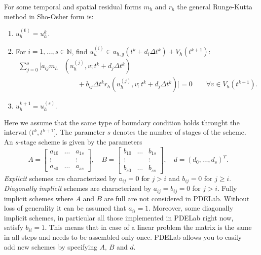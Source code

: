 \documentclass[a4paper,12pt]{article}
\begin{document}
For some temporal and spatial residual forms $m_h$ and $r_h$
the general Runge-Kutta method in Sho-Osher form is:
\begin{enumerate}
\item $u_h^{(0)} = u_h^{k}$.
\item For $i=1,\ldots,s\in\mathbb{N}$, find $u_h^{(i)}\in u_{h,g}(t^k+d_i \Delta t^k) 
+ V_h(t^{k+1})$:
\begin{equation*}
\begin{split}
\sum\limits_{j=0}^{s} \biggl[a_{ij} m_h&\left(u_h^{(j)},v;t^k+d_j \Delta t^k\right) \\
&\qquad + b_{ij} \Delta t^k r_h\left(u_h^{(j)}, v;t^k+d_j \Delta t^k\right) \biggr] = 0 
\qquad \forall v\in V_h(t^{k+1}).
\end{split}
\end{equation*}
\item $u_h^{k+1} = u_h^{(s)}$.
\end{enumerate}
Here we assume that the same type of boundary condition
holds throught the interval $(t^k,t^{k+1}]$. The parameter $s$ denotes
the number of stages of the scheme. 
An $s$-stage scheme is given by the parameters
\begin{equation*}
A = \left[\begin{array}{ccc}
a_{10} & \ldots & a_{1s}\\
\vdots &  & \vdots\\
a_{s0} & \ldots & a_{ss}
\end{array}\right],
\quad B = \left[\begin{array}{ccc}
b_{10} & \ldots & b_{1s}\\
\vdots &  & \vdots\\
b_{s0} & \ldots & b_{ss}
\end{array}\right],
\quad d = \left(
d_{0}, \ldots, d_{s}
\right)^T.
\end{equation*}
\textit{Explicit} schemes are characterized by $a_{ij} = 0$ for $j>i$ and $b_{ij}=0$ for $j\geq i$.
\textit{Diagonally implicit} schemes are characterized by $a_{ij} = b_{ij}= 0$ for $j>i$.
Fully implicit schemes where $A$ and $B$ are full are not considered in PDELab.
Without loss of generality it can be assumed that $a_{ii}=1$. Moreover,
some diagonally implicit schemes, in particular all those implemented in PDELab right
now, satisfy $b_{ii}=1$. This means that in case of a linear problem the matrix is the
same in all steps and needs to be assembled only once.
PDELab allows you to easily add new schemes by specifying $A$, $B$ and $d$.
\end{document}
